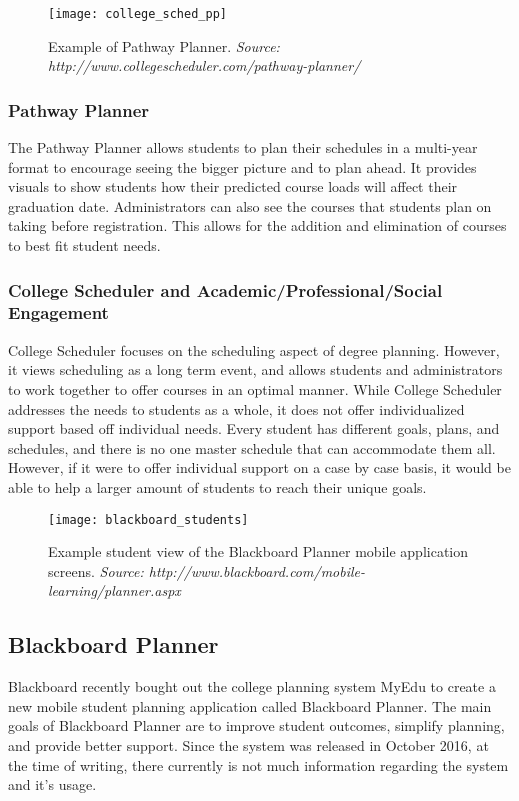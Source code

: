\begin{figure}[h]
\centering
\texttt{[image: college\_sched\_pp]}
\caption{Example of Pathway Planner. \textit{Source: http://www.collegescheduler.com/pathway-planner/}}
\end{figure}

\subsubsection{Pathway Planner}
The Pathway Planner allows students to plan their schedules in a multi-year format to encourage seeing the bigger picture and to plan ahead. It provides visuals to show students how their predicted course loads will affect their graduation date. Administrators can also see the courses that students plan on taking before registration. This allows for the addition and elimination of courses to best fit student needs. 

\subsubsection{College Scheduler and Academic/Professional/Social Engagement}
College Scheduler focuses on the scheduling aspect of degree planning. However, it views scheduling as a long term event, and allows students and administrators to work together to offer courses in an optimal manner. While College Scheduler addresses the needs to students as a whole, it does not offer individualized support based off individual needs. Every student has different goals, plans, and schedules, and there is no one master schedule that can accommodate them all. However, if it were to offer individual support on a case by case basis, it would be able to help a larger amount of students to reach their unique goals. 

\begin{figure}[h]
\centering
\texttt{[image: blackboard\_students]}
\caption{Example student view of the Blackboard Planner mobile application screens. \textit{Source: http://www.blackboard.com/mobile-learning/planner.aspx}}
\end{figure}
\subsection{Blackboard Planner} 
Blackboard recently bought out the college planning system MyEdu to create a new mobile student planning application called Blackboard Planner. \cite{Blackboard} The main goals of Blackboard Planner are to improve student outcomes, simplify planning, and provide better support. Since the system was released in October 2016, at the time of writing, there currently is not much information regarding the system and it's usage.

